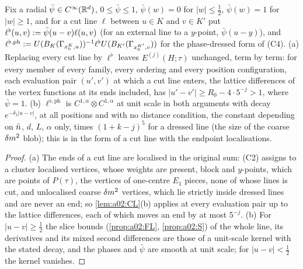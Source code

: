 \begin{lemma}\label{lem:a02:XL}
Fix a radial $\bar\psi\in C^\infty(\mathbb R^d)$, $0\le\bar\psi\le1$, $\bar\psi(w)=0$ for $|w|\le\frac12$, $\bar\psi(w)=1$ for $|w|\ge1$, and for a cut line $\ell$ between $u\in K$ and $v\in K'$ put $\ell^\flat(u,v):=\bar\psi(u-v)\ell(u,v)$ (for an external line to a $y$-point, $\bar\psi(u-y)$), and $\ell^{\flat,\mathrm{ph}}:= U(B_K(\Gamma_{x_0^K,u}))^{-1}\ell^\flat U(B_{K'}(\Gamma_{x_0^{K'},v}))$ for the phase-dressed form of (C4). \textup{(a)} Replacing every cut line by $\ell^\flat$ leaves $E^{(j)}(H;\tau)$ unchanged, term by term: for every member of every family, every ordering and every position configuration, each evaluation pair $(u',v')$ at which a cut line enters, the lattice differences of the vertex functions at its ends included, has $|u'-v'|\ge R_0-4\cdot5^{-j}>1$, where $\bar\psi=1$. \textup{(b)} $\ell^{\flat,\mathrm{ph}}$ is $C^{1,\alpha}\otimes C^{1,\alpha}$ at unit scale in both arguments with decay $e^{-\delta_1|u-v|}$, at all positions and with no distance condition, the constant depending on $\bar n$, $d$, $L$, $\alpha$ only, times $(1+k-j)^5$ for a dressed line (the size of the coarse $\delta m^2$ blob); this is \cite[(3.1)]{Ba3} in the form of a cut line with the endpoint localisations.
\end{lemma}
\begin{proof}
(a) The ends of a cut line are localised in the original sum: (C2) assigns to a cluster localised vertices, whose weights are present, block and $y$-points, which are points of $P(\tau)$, the vertices of one-centre $E_1$ pieces, none of whose lines is cut, and unlocalised coarse $\delta m^2$ vertices, which lie strictly inside dressed lines and are never an end; so \cref{lem:a02:CL}(b) applies at every evaluation pair up to the lattice differences, each of which moves an end by at most $5^{-j}$. (b) For $|u-v|\ge\frac12$ the slice bounds \cite[Thm.~3.3, Props.~3.7--3.9]{K1} (\cref{prop:a02:FL}, \cref{prop:a02:S}) of the whole line, its derivatives and its mixed second differences are those of a unit-scale kernel with the stated decay, and the phases \cite[(3.46)]{K1} and $\bar\psi$ are smooth at unit scale; for $|u-v|<\frac12$ the kernel vanishes.
\end{proof}

